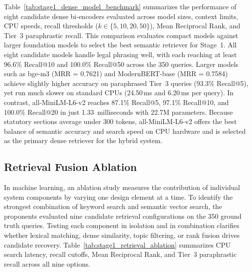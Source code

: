 Table~\ref{tab:stage1_dense_model_benchmark} summarizes the performance of eight candidate dense bi-encoders evaluated across model sizes, context limits, CPU speeds, recall thresholds ($k \in \{5, 10, 20, 50\}$), Mean Reciprocal Rank, and Tier~3 paraphrastic recall. This comparison evaluates compact models against larger foundation models to select the best semantic retriever for Stage~1. All eight candidate models handle legal phrasing well, with each reaching at least 96.6\% Recall@10 and 100.0\% Recall@50 across the 350 queries. Larger models such as bge-m3 (MRR = 0.7621) and ModernBERT-base (MRR = 0.7584) achieve slightly higher accuracy on paraphrased Tier~3 queries (93.3\% Recall@5), yet run much slower on standard CPUs (24.50\,ms and 6.20\,ms per query). In contrast, all-MiniLM-L6-v2 reaches 87.1\% Recall@5, 97.1\% Recall@10, and 100.0\% Recall@20 in just 1.33~milliseconds with 22.7M parameters. Because statutory sections average under 300 tokens, all-MiniLM-L6-v2 offers the best balance of semantic accuracy and search speed on CPU hardware and is selected as the primary dense retriever for the hybrid system.


\subsection{Retrieval Fusion Ablation}
In machine learning, an ablation study measures the contribution of individual system components by varying one design element at a time. To identify the strongest combination of keyword search and semantic vector search, the proponents evaluated nine candidate retrieval configurations on the 350 ground truth queries. Testing each component in isolation and in combination clarifies whether lexical matching, dense similarity, topic filtering, or rank fusion drives candidate recovery. Table~\ref{tab:stage1_retrieval_ablation} summarizes CPU search latency, recall cutoffs, Mean Reciprocal Rank, and Tier~3 paraphrastic recall across all nine options.


